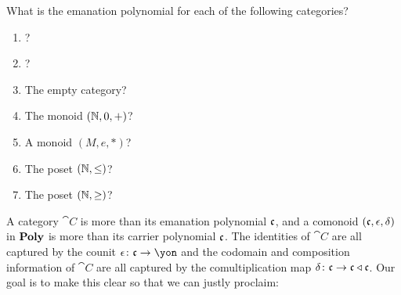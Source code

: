 \documentclass[DynamicalBook]{subfiles}
\begin{document}
\begin{exercise}
What is the emanation polynomial for each of the following categories?
\begin{enumerate}
	\item {}?
	\item {}?
	\item The empty category?
	\item The monoid $(\mathbb{N},0,+)$?
	\item A monoid $(M, e, *)$?
	\item The poset $(\mathbb{N},\leq)$?
	\item The poset $(\mathbb{N},\geq)$?
\qedhere
\end{enumerate}
\end{exercise}

A category $\cat{C}$ is more than its emanation polynomial $\mathfrak{c}$, and a comonoid $(\mathfrak{c},\epsilon,\delta)$ in $\textbf{Poly}$ is more than its carrier polynomial $\mathfrak{c}$. The identities of $\cat{C}$ are all captured by the counit $\epsilon\colon\ema{c}\to\yon$ and the codomain and composition information of $\cat{C}$ are all captured by the comultiplication map $\delta\colon\mathfrak{c}\to\mathfrak{c}\mathbin{\triangleleft}\mathfrak{c}$. Our goal is to make this clear so that we can justly proclaim:

\end{document}
